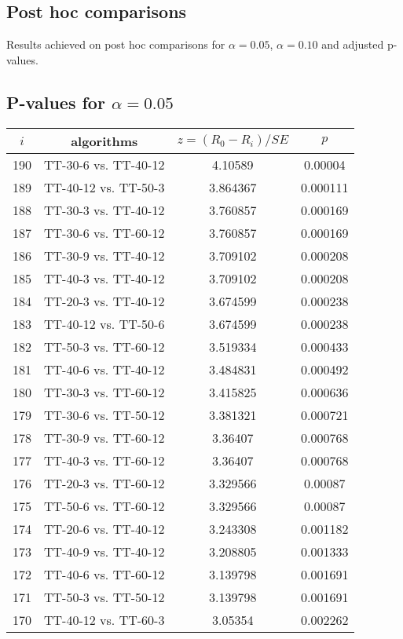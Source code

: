 \documentclass[a4paper,10pt]{article}
\begin{document}
\begin{landscape}
\section{Post hoc comparisons}

Results achieved on post hoc comparisons for $\alpha = 0.05$, $\alpha = 0.10$ and adjusted p-values.

\subsection{P-values for $\alpha=0.05$}

\begin{table}[!htp]
\centering\scriptsize
\begin{tabular}{cccc}
$i$&algorithms&$z=(R_0 - R_i)/SE$&$p$\\
\hline190&TT-30-6 vs. TT-40-12&4.10589&0.00004\\
189&TT-40-12 vs. TT-50-3&3.864367&0.000111\\
188&TT-30-3 vs. TT-40-12&3.760857&0.000169\\
187&TT-30-6 vs. TT-60-12&3.760857&0.000169\\
186&TT-30-9 vs. TT-40-12&3.709102&0.000208\\
185&TT-40-3 vs. TT-40-12&3.709102&0.000208\\
184&TT-20-3 vs. TT-40-12&3.674599&0.000238\\
183&TT-40-12 vs. TT-50-6&3.674599&0.000238\\
182&TT-50-3 vs. TT-60-12&3.519334&0.000433\\
181&TT-40-6 vs. TT-40-12&3.484831&0.000492\\
180&TT-30-3 vs. TT-60-12&3.415825&0.000636\\
179&TT-30-6 vs. TT-50-12&3.381321&0.000721\\
178&TT-30-9 vs. TT-60-12&3.36407&0.000768\\
177&TT-40-3 vs. TT-60-12&3.36407&0.000768\\
176&TT-20-3 vs. TT-60-12&3.329566&0.00087\\
175&TT-50-6 vs. TT-60-12&3.329566&0.00087\\
174&TT-20-6 vs. TT-40-12&3.243308&0.001182\\
173&TT-40-9 vs. TT-40-12&3.208805&0.001333\\
172&TT-40-6 vs. TT-60-12&3.139798&0.001691\\
171&TT-50-3 vs. TT-50-12&3.139798&0.001691\\
170&TT-40-12 vs. TT-60-3&3.05354&0.002262\\

\end{tabular}
\end{table}
\end{landscape}
\end{document}

